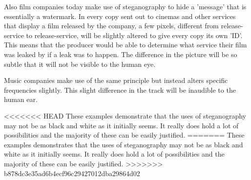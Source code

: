 Also film companies today make use of steganography to hide a 'message' that is essentially a watermark.
In every copy sent out to cinemas and other services that display a film released by the company, a few pixels, different from release-service to release-service, will be slightly altered to give every copy its own 'ID'.
This means that the producer would be able to determine what service their film was leaked by if a leak was to happen.
The difference in the picture will be so subtle that it will not be visible to the human eye.

Music companies make use of the same principle but instead alters specific frequencies slightly.
This slight difference in the track will be inaudible to the human ear. \cite{Anderson1998}


<<<<<<< HEAD
These examples demonstrate that the uses of steganography may not be as black and white as it initially seems. It really does hold a lot of possibilities and the majority of these can be easily justified.
=======
These examples demonstrates that the uses of steganography may not be as black and white as it initially seems.
It really does hold a lot of possibilities and the majority of these can be easily justified.
>>>>>>> b878dc3e35ad6b4ecf96c29427012dba29864d02

